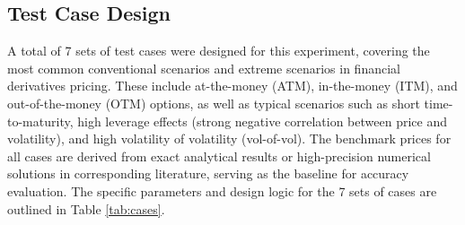 \subsection{Test Case Design}
A total of 7 sets of test cases were designed for this experiment, covering the most common conventional scenarios and extreme scenarios in financial derivatives pricing. These include at-the-money (ATM), in-the-money (ITM), and out-of-the-money (OTM) options, as well as typical scenarios such as short time-to-maturity, high leverage effects (strong negative correlation between price and volatility), and high volatility of volatility (vol-of-vol). The benchmark prices for all cases are derived from exact analytical results or high-precision numerical solutions in corresponding literature, serving as the baseline for accuracy evaluation. The specific parameters and design logic for the 7 sets of cases are outlined in Table \ref{tab:cases}.

